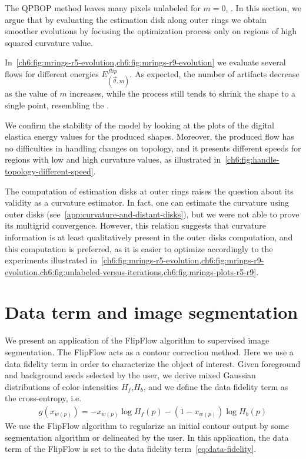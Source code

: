 The QPBOP method leaves many pixels unlabeled for $m=0$, . In this section, we argue that by evaluating the estimation disk along outer rings we obtain smoother evolutions by focusing the optimization process only on regions of high squared curvature value.

In~\cref{ch6:fig:mrings-r5-evolution,ch6:fig:mrings-r9-evolution} we evaluate several flows for different energies $E_{(\vec{\theta},m)}^{flip}$. As expected, the number of artifacts decrease as the value of $m$ increases, while the process still tends to shrink the shape to a single point, resembling the . 

We confirm the stability of the model by looking at the plots of the digital elastica energy values for the produced shapes. Moreover, the produced flow has no difficulties in handling changes on topology, and it presents different speeds for regions with low and high curvature values, as illustrated in~\cref{ch6:fig:handle-topology-different-speed}.

The computation of estimation disks at outer rings raises the question about its validity as a curvature estimator. In fact, one can estimate the curvature using outer disks (see~\cref{app:curvature-and-distant-disks}), but we were not able to prove its multigrid convergence. However, this relation suggests that curvature information is at least qualitatively present in the outer disks computation, and this computation is preferred, as it is easier to optimize accordingly to the experiments illustrated in~\cref{ch6:fig:mrings-r5-evolution,ch6:fig:mrings-r9-evolution,ch6:fig:unlabeled-versus-iterations,ch6:fig:mrings-plots-r5-r9}.




\section{Data term and image segmentation}
\label{ch6:sec:data-term-image-segmentation}

We present an application of the FlipFlow algorithm to supervised image segmentation. The FlipFlow acts as a contour correction method. Here we use a data fidelity term in order to characterize the object of interest. Given foreground and background seeds selected by the user, we derive mixed Gaussian distributions of color intensities $H_f$,$H_b$, and we define the data fidelity term as the cross-entropy, i.e.
\begin{align}
  g(x_{w(p)}) = -x_{w(p)}\log{H_f(p)} - (1-x_{w(p)})\log{H_b(p)}
  \label{eq:data-fidelity}
\end{align}	
%
We use the FlipFlow algorithm to regularize an initial contour output by some segmentation algorithm or delineated by the user. In this application, the data term of the FlipFlow
is set to the data fidelity term~\cref{eq:data-fidelity}.
	
